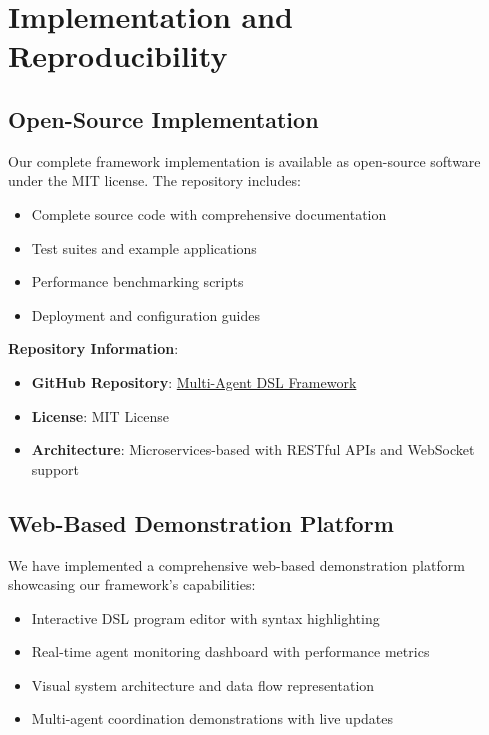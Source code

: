 \documentclass[conference]{IEEEtran}
\begin{document}
\section{Implementation and Reproducibility}

\subsection{Open-Source Implementation}

Our complete framework implementation is available as open-source software under the MIT license. The repository includes:

\begin{itemize}
\item Complete source code with comprehensive documentation
\item Test suites and example applications
\item Performance benchmarking scripts
\item Deployment and configuration guides
\end{itemize}

\textbf{Repository Information}:
\begin{itemize}
\item \textbf{GitHub Repository}: \href{https://github.com/Max-YUAN-22/Multi-Agent_DSLframework}{Multi-Agent DSL Framework}
\item \textbf{License}: MIT License
\item \textbf{Architecture}: Microservices-based with RESTful APIs and WebSocket support
\end{itemize}

\subsection{Web-Based Demonstration Platform}

We have implemented a comprehensive web-based demonstration platform showcasing our framework's capabilities:

\begin{itemize}
\item Interactive DSL program editor with syntax highlighting
\item Real-time agent monitoring dashboard with performance metrics
\item Visual system architecture and data flow representation
\item Multi-agent coordination demonstrations with live updates
\end{itemize}
\end{document}
